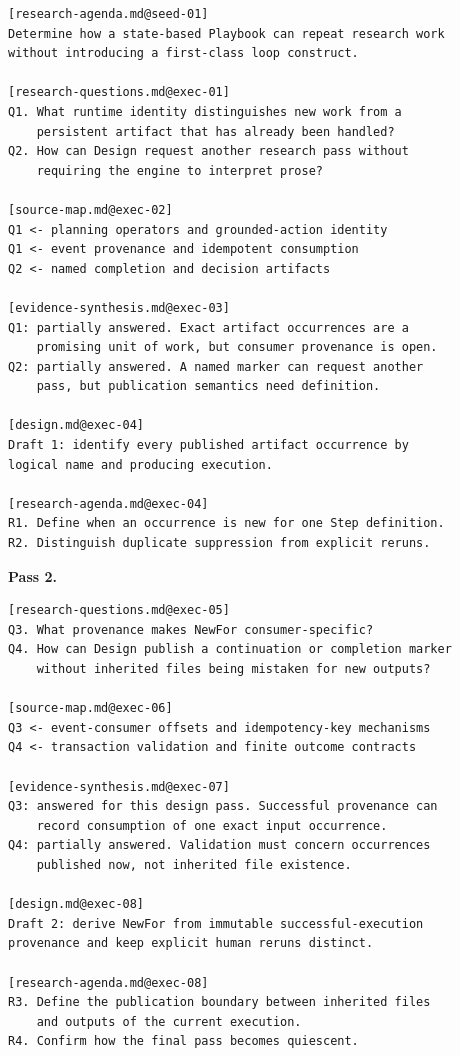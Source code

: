 \documentclass[11pt]{article}
\begin{document}
\begin{lstlisting}[style=playbook,basicstyle=\ttfamily\scriptsize]
[research-agenda.md@seed-01]
Determine how a state-based Playbook can repeat research work
without introducing a first-class loop construct.

[research-questions.md@exec-01]
Q1. What runtime identity distinguishes new work from a
    persistent artifact that has already been handled?
Q2. How can Design request another research pass without
    requiring the engine to interpret prose?

[source-map.md@exec-02]
Q1 <- planning operators and grounded-action identity
Q1 <- event provenance and idempotent consumption
Q2 <- named completion and decision artifacts

[evidence-synthesis.md@exec-03]
Q1: partially answered. Exact artifact occurrences are a
    promising unit of work, but consumer provenance is open.
Q2: partially answered. A named marker can request another
    pass, but publication semantics need definition.

[design.md@exec-04]
Draft 1: identify every published artifact occurrence by
logical name and producing execution.

[research-agenda.md@exec-04]
R1. Define when an occurrence is new for one Step definition.
R2. Distinguish duplicate suppression from explicit reruns.
\end{lstlisting}

\medskip
\noindent\textbf{Pass 2.}\par\smallskip

\begin{lstlisting}[style=playbook,basicstyle=\ttfamily\scriptsize]
[research-questions.md@exec-05]
Q3. What provenance makes NewFor consumer-specific?
Q4. How can Design publish a continuation or completion marker
    without inherited files being mistaken for new outputs?

[source-map.md@exec-06]
Q3 <- event-consumer offsets and idempotency-key mechanisms
Q4 <- transaction validation and finite outcome contracts

[evidence-synthesis.md@exec-07]
Q3: answered for this design pass. Successful provenance can
    record consumption of one exact input occurrence.
Q4: partially answered. Validation must concern occurrences
    published now, not inherited file existence.

[design.md@exec-08]
Draft 2: derive NewFor from immutable successful-execution
provenance and keep explicit human reruns distinct.

[research-agenda.md@exec-08]
R3. Define the publication boundary between inherited files
    and outputs of the current execution.
R4. Confirm how the final pass becomes quiescent.
\end{lstlisting}
\end{document}
